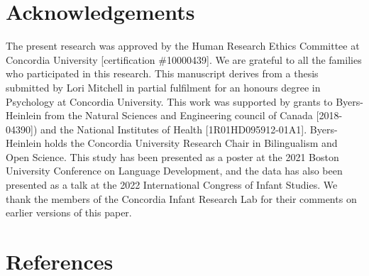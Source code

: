 \documentclass[
  ,man,floatsintext]{apa6}
\begin{document}
\newpage

\hypertarget{acknowledgements}{%
\section{Acknowledgements}\label{acknowledgements}}

\noindent The present research was approved by the Human Research Ethics Committee at Concordia University {[}certification \#10000439{]}. We are grateful to all the families who participated in this research. This manuscript derives from a thesis submitted by Lori Mitchell in partial fulfilment for an honours degree in Psychology at Concordia University. This work was supported by grants to Byers-Heinlein from the Natural Sciences and Engineering council of Canada {[}2018-04390{]}) and the National Institutes of Health {[}1R01HD095912-01A1{]}. Byers-Heinlein holds the Concordia University Research Chair in Bilingualism and Open Science. This study has been presented as a poster at the 2021 Boston University Conference on Language Development, and the data has also been presented as a talk at the 2022 International Congress of Infant Studies. We thank the members of the Concordia Infant Research Lab for their comments on earlier versions of this paper.

\newpage

\hypertarget{references}{%
\section{References}\label{references}}

\begingroup
\setlength{\parindent}{-0.5in}
\end{document}
